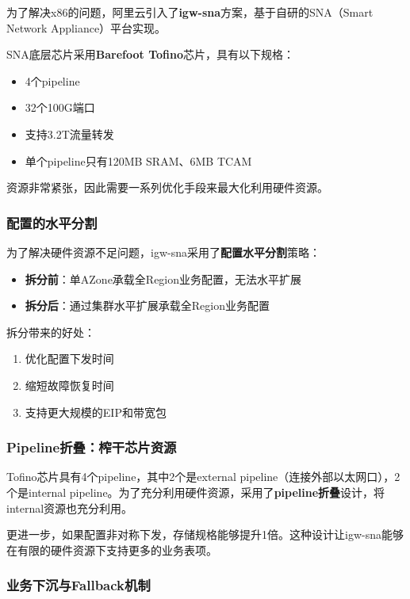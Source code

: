 为了解决x86的问题，阿里云引入了\textbf{igw-sna}方案，基于自研的SNA（Smart Network Appliance）平台实现。

SNA底层芯片采用\textbf{Barefoot Tofino}芯片，具有以下规格：
\begin{itemize}
    \item 4个pipeline
    \item 32个100G端口
    \item 支持3.2T流量转发
    \item 单个pipeline只有120MB SRAM、6MB TCAM
\end{itemize}

资源非常紧张，因此需要一系列优化手段来最大化利用硬件资源。

\subsubsection{配置的水平分割}

为了解决硬件资源不足问题，igw-sna采用了\textbf{配置水平分割}策略：

\begin{itemize}
    \item \textbf{拆分前}：单AZone承载全Region业务配置，无法水平扩展
    \item \textbf{拆分后}：通过集群水平扩展承载全Region业务配置
\end{itemize}

拆分带来的好处：
\begin{enumerate}
    \item 优化配置下发时间
    \item 缩短故障恢复时间
    \item 支持更大规模的EIP和带宽包
\end{enumerate}

\subsubsection{Pipeline折叠：榨干芯片资源}

Tofino芯片具有4个pipeline，其中2个是external pipeline（连接外部以太网口），2个是internal pipeline。为了充分利用硬件资源，采用了\textbf{pipeline折叠}设计，将internal资源也充分利用。

更进一步，如果配置非对称下发，存储规格能够提升1倍。这种设计让igw-sna能够在有限的硬件资源下支持更多的业务表项。

\subsubsection{业务下沉与Fallback机制}

